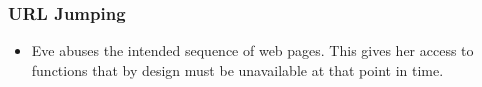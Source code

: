 %
%




\begin{frame}
    \frametitle{URL Jumping}
    \begin{itemize}
        \item Eve abuses the intended sequence of web pages. This gives her access to functions that by design must be unavailable at that point in time. 
    \end{itemize}
\end{frame}

